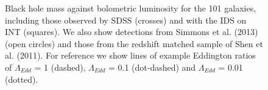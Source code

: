 \begin{figure}
\caption[Black hole mass against luminosity for the bulgeless AGN sample]{Black hole mass against bolometric luminosity for the 101 galaxies, including those observed by SDSS (crosses) and with the IDS on INT (squares). We also show detections from {\notebsm Simmons et al. (2013)} (open circles) and those from the redshift matched sample of {\notebsm Shen et al. (2011)}. For reference we show lines of example Eddington ratios of $\Lambda_{Edd}$ = 1 (dashed),  $\Lambda_{Edd}$ = 0.1 (dot-dashed) and $\Lambda_{Edd}$ = 0.01 (dotted).
}
\label{fig:mbhvsbol}
\end{figure}

